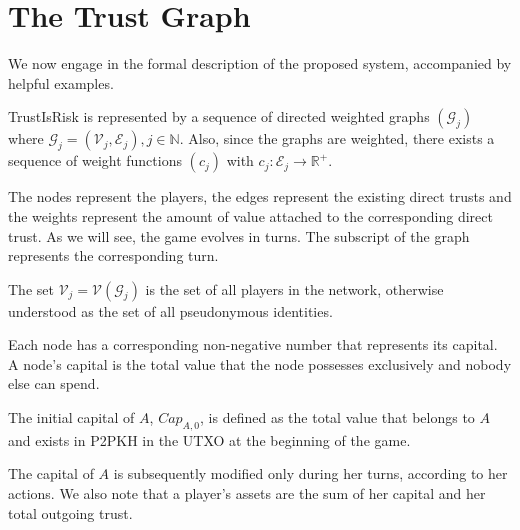 \documentclass[11pt]{llncs}
\theoremstyle{definition}
\begin{document}
  \section{The Trust Graph}
     We now engage in the formal description of the proposed system, accompanied by helpful examples.
     \begin{definition}[Graph]
        TrustIsRisk is represented by a sequence of directed weighted graphs $\left(\mathcal{G}_j\right)$ where $\mathcal{G}_j
        = \left(\mathcal{V}_j, \mathcal{E}_j\right), j \in \mathbb{N}$.
        Also, since the graphs are weighted, there exists a sequence of weight functions $\left(c_j\right)$ with $c_j :
        \mathcal{E}_j \rightarrow \mathbb{R}^{+}$.
     \end{definition}
     The nodes represent the players, the edges represent the existing direct trusts and the weights represent the amount of
     value attached to the corresponding direct trust. As we will see, the game evolves in turns. The subscript of the graph
     represents the corresponding turn.
     \begin{definition}[Players]
        The set $\mathcal{V}_j = \mathcal{V}\left(\mathcal{G}_j\right)$ is the set of all players in the network, otherwise
        understood as the set of all pseudonymous identities.
     \end{definition}
     Each node has a corresponding non-negative number that represents its capital. A node's capital is the total value that
     the node possesses exclusively and nobody else can spend.
     \begin{definition}[Capital]
        The initial capital of $A$, $Cap_{A, 0}$, is defined as the total value that belongs to $A$ and exists in P2PKH in
        the UTXO at the beginning of the game.
     \end{definition}
     The capital of $A$ is subsequently modified only during her turns, according to her actions. We also note that a
     player's assets are the sum of her capital and her total outgoing trust.
\end{document}
